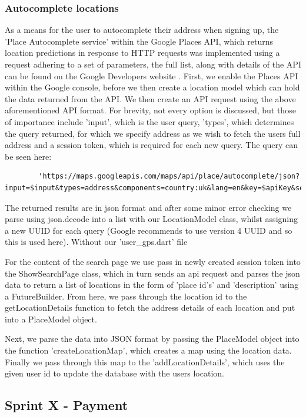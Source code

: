 \documentclass[12pt]{article}
\begin{document}
	\subsubsection{Autocomplete locations}
	As a means for the user to autocomplete their address when signing up, the 'Place Autocomplete service' within the Google Places API, which returns location predictions in response to HTTP requests was implemented using a request adhering to a set of parameters, the full list, along with details of the API can be found on the Google Developers website \cite{requests}.
	First, we enable the Places API within the Google console, before we then create a location model which can hold the data returned from the API. We then create an API request using the above aforementioned API format. For brevity, not every option is discussed, but those of importance include 'input', which is the user query, 'types', which determines the query returned, for which we specify address as we wish to fetch the users full address and a session token, which is required for each new query. The query can be seen here:
	\begin{lstlisting}
		'https://maps.googleapis.com/maps/api/place/autocomplete/json?input=$input&types=address&components=country:uk&lang=en&key=$apiKey&sessiontoken=$sessionToken'
	\end{lstlisting}
	The returned results are in json format and after some minor error checking we parse using json.decode into a list with our LocationModel class, whilst assigning a new UUID for each query (Google recommends to use version 4 UUID and so this is used here). Without our 'user\_gps.dart' file
	
	For the content of the search page we use pass in newly created session token into the ShowSearchPage class, which in turn sends an api request and parses the json data to return a list of locations in the form of 'place id's' and 'description' using a FutureBuilder. From here, we pass through the location id to the getLocationDetails function to fetch the address details of each location and put into a PlaceModel object.
	
	Next, we parse the data into JSON format by passing the PlaceModel object into the function 'createLocationMap', which creates a map using the location data. Finally we pass through this map to the 'addLocationDetails', which uses the given user id to update the database with the users location.
	
	\subsection{Sprint X - Payment}
	
\end{document}
